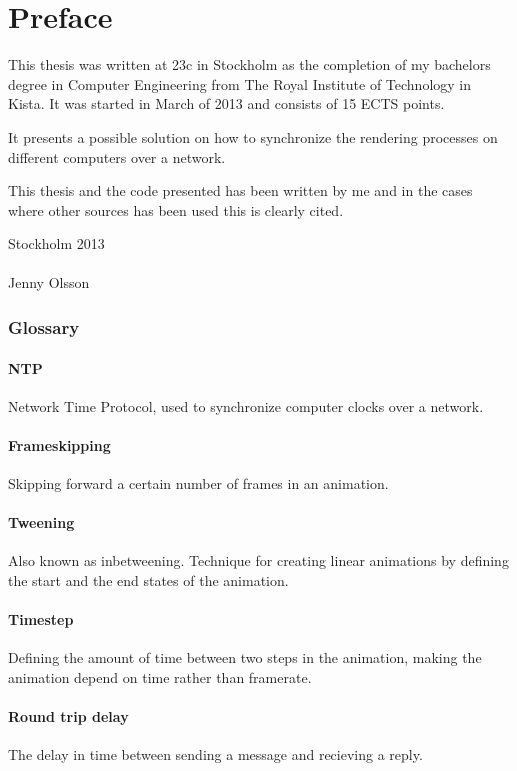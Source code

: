 \chapter{Preface}

This thesis was written at 23c in Stockholm as the completion of my bachelors degree in Computer Engineering from The Royal Institute of Technology in Kista. It was started in March of 2013 and consists of 15 ECTS points. 

It presents a possible solution on how to synchronize the rendering processes on different computers over a network. 

This thesis and the code presented has been written by me and in the cases where other sources has been used this is clearly cited. 


\vspace{20mm}
\mbox{}\hfill
\begin{minipage}[t]{80mm}
  Stockholm 2013\\
  \vspace{1cm}\\
  Jenny Olsson
\end{minipage}

\subsection*{Glossary}

\subsubsection*{NTP}
Network Time Protocol, used to synchronize computer clocks over a network. 

\subsubsection*{Frameskipping}
Skipping forward a certain number of frames in an animation.

\subsubsection*{Tweening}
Also known as inbetweening. Technique for creating linear animations by defining the start and the end states of the animation. 

\subsubsection*{Timestep}
Defining the amount of time between two steps in the animation, making the animation depend on time rather than framerate.

\subsubsection*{Round trip delay}
The delay in time between sending a message and recieving a reply. 

